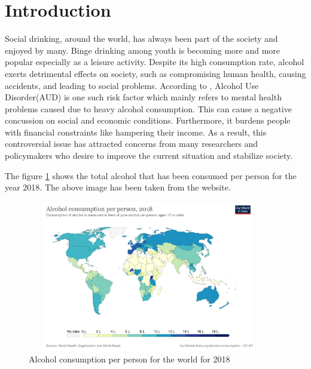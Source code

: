 \documentclass[11pt,a4paper,]{article}
\begin{document}
\pagebreak

\section{Introduction}\label{introduction}

Social drinking, around the world, has always been part of the society and enjoyed by many. Binge drinking among youth is becoming more and more popular especially as a leisure activity.
Despite its high consumption rate, alcohol exerts detrimental effects on society, such as compromising human health, causing accidents, and leading to social problems. According to \textcite{nationalnational}, Alcohol Use Disorder(AUD) is one such risk factor which mainly refers to mental health problems caused due to heavy alcohol consumption. This can cause a negative concussion on social and economic conditions. Furthermore, it burdens people with financial constraints like hampering their income. As a result, this controversial issue has attracted concerns from many researchers and policymakers who desire to improve the current situation and stabilize society.

The figure \ref{fig:worldmap} shows the total alcohol that has been consumed per person for the year 2018. The above image has been taken from the \textcite{owidalcoholconsumption} website.

\begin{figure}

{\centering \includegraphics[width=400px,height=250px]{images/worldmap} 

}

\caption{Alcohol consumption per person for the world for 2018}\label{fig:worldmap}
\end{figure}
\end{document}
